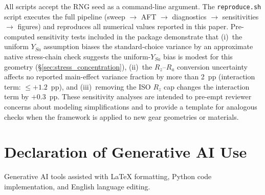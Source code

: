 \documentclass[twocolumn,12pt,a4paper]{article}
\begin{document}
All scripts accept the RNG seed as a command-line argument. The
\texttt{reproduce.sh} script executes the full pipeline
(sweep $\rightarrow$ AFT $\rightarrow$ diagnostics $\rightarrow$
sensitivities $\rightarrow$ figures) and reproduces all numerical
values reported in this paper. Pre-computed
sensitivity tests included in the package demonstrate that (i)~the
uniform $Y_{Sa}$ assumption biases the standard-choice variance by
an approximate native stress-chain check suggests the uniform-$Y_{Sa}$
bias is modest for this geometry (\S\ref{sec:stress_concentration}), (ii)~the
$R_z$--$R_a$ conversion uncertainty affects no reported main-effect
variance fraction by more than 2~pp (interaction term: $\leq +1.2$~pp), and (iii)~removing the ISO $R_z$ cap
changes the interaction term by $+0.3$~pp. These sensitivity analyses
are intended to pre-empt reviewer concerns about modeling
simplifications and to provide a template for analogous checks when
the framework is applied to new gear geometries or materials.

\section*{Declaration of Generative AI Use}

Generative AI tools assisted with LaTeX formatting, Python code
implementation, and English language editing.
\end{document}
